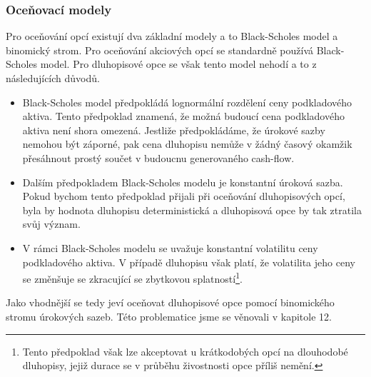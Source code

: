 \documentclass[a4paper]{book}
\begin{document}
\subsubsection{Oceňovací modely}

Pro oceňování opcí existují dva základní modely a to Black-Scholes model a binomický strom. Pro oceňování akciových opcí se standardně používá Black-Scholes model. Pro dluhopisové opce se však tento model nehodí a to z následujících důvodů.
\begin{itemize}
\item Black-Scholes model předpokládá lognormální rozdělení ceny podkladového aktiva. Tento předpoklad znamená, že možná budoucí cena podkladového aktiva není shora omezená. Jestliže předpokládáme, že úrokové sazby nemohou být záporné, pak cena dluhopisu nemůže v žádný časový okamžik přesáhnout prostý součet v budoucnu generovaného cash-flow.
\item Dalším předpokladem Black-Scholes modelu je konstantní úroková sazba. Pokud bychom tento předpoklad přijali při oceňování dluhopisových opcí, byla by hodnota dluhopisu deterministická a dluhopisová opce by tak ztratila svůj význam.
\item V rámci Black-Scholes modelu se uvažuje konstantní volatilitu ceny podkladového aktiva. V případě dluhopisu však platí, že volatilita jeho ceny se změnšuje se zkracující se zbytkovou splatností\footnote{Tento předpoklad však lze akceptovat u krátkodobých opcí na dlouhodobé dluhopisy, jejiž durace se v průběhu živostnosti opce příliš nemění.}. 
\end{itemize}
Jako vhodnější se tedy jeví oceňovat dluhopisové opce pomocí binomického stromu úrokových sazeb. Této problematice jsme se věnovali v kapitole 12.\\
\end{document}
